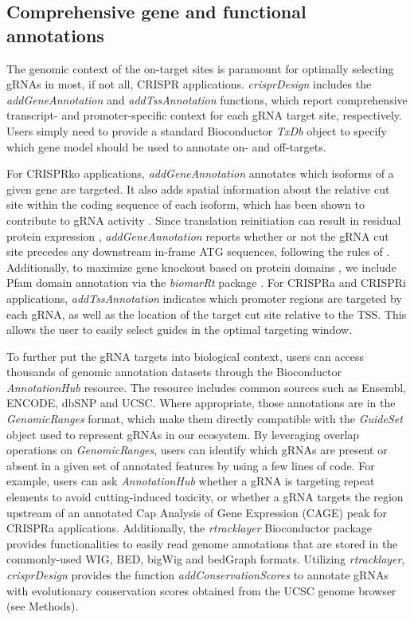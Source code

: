 \documentclass[pdftex,english,10pt]{article}
\begin{document}
\subsection*{Comprehensive gene and functional annotations}

The genomic context of the on-target sites is paramount for optimally selecting gRNAs in most, if not all, CRISPR applications. 
\textit{crisprDesign} includes the \textit{addGeneAnnotation} and \textit{addTssAnnotation} functions, which 
report comprehensive transcript- and promoter-specific context for each gRNA target site, respectively. 
Users simply need to provide a standard Bioconductor \textit{TxDb} object to specify which gene model should be used to annotate on- and off-targets.

For CRISPRko applications, \textit{addGeneAnnotation} annotates which isoforms of a given gene are targeted. It also adds spatial information about the relative cut site within the coding sequence of each isoform, which has been shown to contribute to gRNA activity \citep{azimuth}. Since translation reinitiation can result in residual protein expression \citep{smits2019biological}, \textit{addGeneAnnotation} reports whether or not the gRNA cut site precedes any downstream in-frame ATG sequences, following the rules of \citet{cohen2019nonsense}. Additionally, to maximize gene knockout based on protein domains \citep{he2019novo}, we include Pfam domain annotation \citep{pfam} via the \textit{biomarRt} package \citep{biomart}. For CRISPRa and CRISPRi applications, \textit{addTssAnnotation} indicates which promoter regions are targeted by each gRNA, as well as the location of the target cut site relative to the TSS. This allows the user to easily select guides in the optimal targeting window. 
 
To further put the gRNA targets into biological context, users can access thousands of genomic annotation datasets through the Bioconductor \textit{AnnotationHub} resource.  The resource includes common sources such as Ensembl, ENCODE, dbSNP and UCSC. Where appropriate, those annotations are in the \textit{GenomicRanges} format, which make them directly compatible with the \textit{GuideSet} object used to represent gRNAs in our ecosystem. By leveraging overlap operations on \textit{GenomicRanges}, users can identify which gRNAs are present or absent in a given set of annotated features by using a few lines of code.  For example, users can ask \textit{AnnotationHub} whether a gRNA is targeting repeat elements to avoid cutting-induced toxicity, or whether a gRNA targets the region upstream of an annotated Cap Analysis of Gene Expression (CAGE) peak for CRISPRa applications. Additionally, the \textit{rtracklayer} Bioconductor package \citep{rtracklayer} provides functionalities to easily read genome annotations that are stored in the commonly-used WIG, BED, bigWig and bedGraph formats. Utilizing \textit{rtracklayer}, \textit{crisprDesign} provides the function \textit{addConservationScores} to annotate gRNAs with evolutionary conservation scores obtained from the UCSC genome browser (see Methods). 
\end{document}
